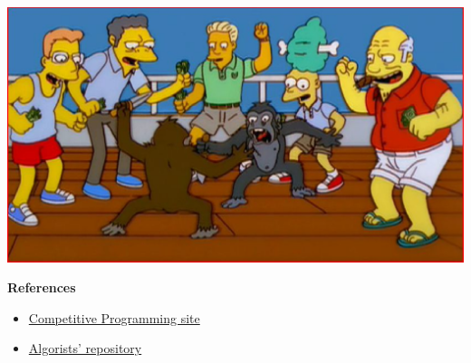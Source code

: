 \documentclass[article]{beamer}
\begin{document}
\begin{frame}[plain]
\frametitle{}
\begin{center}
\Huge{\color{blue}{Q \& A}} \\
\vspace{5mm}
\includegraphics[scale=0.4]{./figures/monkey_fight.eps}
\end{center}
\end{frame}

\begin{frame}[plain]
	\textbf{References}
	\begin{itemize}
		\item \href{https://sites.google.com/site/stevenhalim/}{Competitive Programming site}
		\item \href{https://github.com/davidjacobo/algorists/}{Algorists' repository}
	\end{itemize}
\end{frame}
\end{document}
